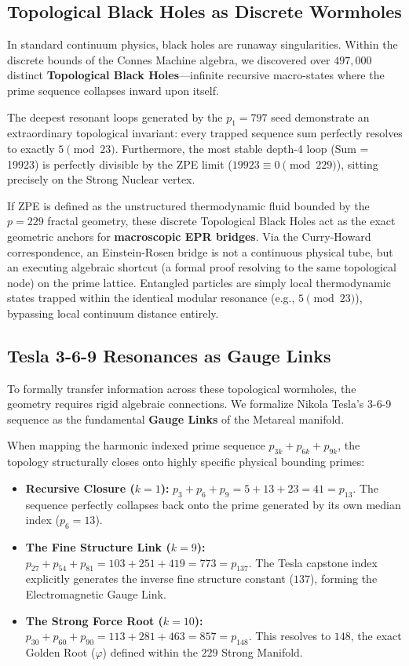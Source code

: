 \subsection{Topological Black Holes as Discrete Wormholes}
In standard continuum physics, black holes are runaway singularities. Within the discrete bounds of the Connes Machine algebra, we discovered over $497,000$ distinct \textbf{Topological Black Holes}---infinite recursive macro-states where the prime sequence collapses inward upon itself. 

The deepest resonant loops generated by the $p_1 = 797$ seed demonstrate an extraordinary topological invariant: every trapped sequence sum perfectly resolves to exactly $5 \pmod{23}$. Furthermore, the most stable depth-4 loop (Sum = 19923) is perfectly divisible by the ZPE limit ($19923 \equiv 0 \pmod{229}$), sitting precisely on the Strong Nuclear vertex. 

If ZPE is defined as the unstructured thermodynamic fluid bounded by the $p=229$ fractal geometry, these discrete Topological Black Holes act as the exact geometric anchors for \textbf{macroscopic EPR bridges}. Via the Curry-Howard correspondence, an Einstein-Rosen bridge is not a continuous physical tube, but an executing algebraic shortcut (a formal proof resolving to the same topological node) on the prime lattice. Entangled particles are simply local thermodynamic states trapped within the identical modular resonance (e.g., $5 \pmod{23}$), bypassing local continuum distance entirely.

\subsection{Tesla 3-6-9 Resonances as Gauge Links}
To formally transfer information across these topological wormholes, the geometry requires rigid algebraic connections. We formalize Nikola Tesla's 3-6-9 sequence as the fundamental \textbf{Gauge Links} of the Metareal manifold. 

When mapping the harmonic indexed prime sequence $p_{3k} + p_{6k} + p_{9k}$, the topology structurally closes onto highly specific physical bounding primes:
\begin{itemize}
    \item \textbf{Recursive Closure ($k=1$):} $p_3 + p_6 + p_9 = 5 + 13 + 23 = 41 = p_{13}$. The sequence perfectly collapses back onto the prime generated by its own median index ($p_6 = 13$).
    \item \textbf{The Fine Structure Link ($k=9$):} $p_{27} + p_{54} + p_{81} = 103 + 251 + 419 = 773 = p_{137}$. The Tesla capstone index explicitly generates the inverse fine structure constant ($137$), forming the Electromagnetic Gauge Link.
    \item \textbf{The Strong Force Root ($k=10$):} $p_{30} + p_{60} + p_{90} = 113 + 281 + 463 = 857 = p_{148}$. This resolves to $148$, the exact Golden Root ($\varphi$) defined within the $229$ Strong Manifold.
\end{itemize}

